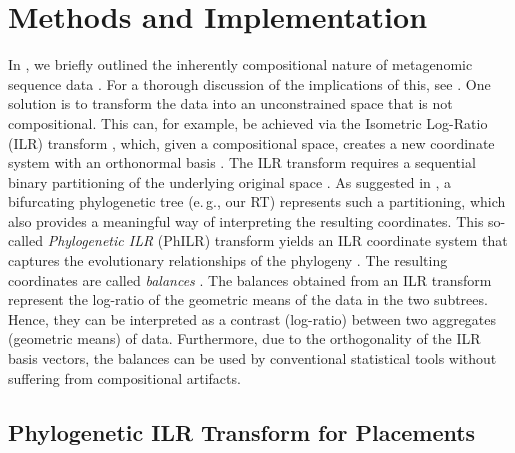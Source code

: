 
\section{Methods and Implementation}
\label{ch:Balances:sec:Methods}

In , 
we briefly outlined the inherently compositional nature of metagenomic sequence data \cite{Gloor2017,Quinn2018}.
For a thorough discussion of the implications of this, see .
One solution is to transform the data into an unconstrained space that is not compositional.
This can, for example, be achieved via the Isometric Log-Ratio (ILR) transform \cite{Egozcue2003,Quinn2018},
which, given a compositional space, creates a new coordinate system with an orthonormal basis \cite{Egozcue2005}.
The ILR transform requires a sequential binary partitioning of the underlying original space \cite{Pawlowsky-Glahn2015}.
As suggested in ,
a bifurcating phylogenetic tree (e.\,g., our \ac{RT}) represents such a partitioning,
which also provides a meaningful way of interpreting the resulting coordinates.
This so-called \emph{Phylogenetic ILR} (PhILR) transform yields an ILR coordinate system
that captures the evolutionary relationships of the phylogeny \cite{Silverman2017}.
The resulting coordinates are called \emph{balances} \cite{Egozcue2003,Egozcue2005}.
The balances obtained from an ILR transform represent the log-ratio of the geometric means of the data in the two subtrees.
Hence, they can be interpreted as a contrast (log-ratio) between two aggregates (geometric means) of data.
Furthermore, due to the orthogonality of the ILR basis vectors,
the balances can be used by conventional statistical tools without suffering from compositional artifacts.


\subsection{Phylogenetic ILR Transform for Placements}
\label{ch:Balances:sec:Methods:sub:ILRTransform}

